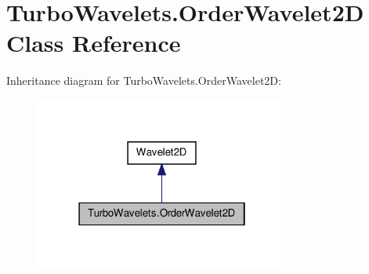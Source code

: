 \hypertarget{class_turbo_wavelets_1_1_order_wavelet2_d}{\section{\-Turbo\-Wavelets.\-Order\-Wavelet2\-D \-Class \-Reference}
\label{class_turbo_wavelets_1_1_order_wavelet2_d}
}


\-Inheritance diagram for \-Turbo\-Wavelets.\-Order\-Wavelet2\-D\-:
\nopagebreak
\begin{figure}[H]
\begin{center}
\leavevmode
\includegraphics[width=238pt]{class_turbo_wavelets_1_1_order_wavelet2_d__inherit__graph}
\end{center}
\end{figure}
